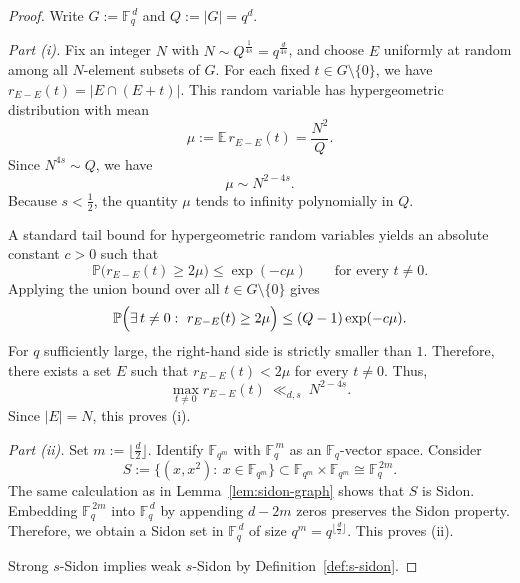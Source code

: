 \documentclass{article}
\begin{document}
\begin{proof}
Write $G:=\mathbb{F}_q^{\,d}$ and $Q:=|G|=q^d$.

\smallskip
\noindent
\emph{Part (i).}
Fix an integer $N$ with $N\sim Q^{\frac{1}{4s}}=q^{\frac{d}{4s}}$, and choose $E$ uniformly at random among all $N$-element subsets of $G$.
For each fixed $t\in G\setminus\{0\}$, we have $r_{E-E}(t)=|E\cap(E+t)|$.
This random variable has hypergeometric distribution with mean
\[
\mu:=\mathbb{E}\,r_{E-E}(t)=\frac{N^2}{Q}.
\]
Since $N^{4s}\sim Q$, we have
\[
\mu\sim N^{2-4s}.
\]
Because $s<\frac{1}{2}$, the quantity $\mu$ tends to infinity polynomially in $Q$.

A standard tail bound for hypergeometric random variables yields an absolute constant $c>0$ such that
\[
\mathbb{P}\bigl(r_{E-E}(t)\ge 2\mu\bigr)\le \exp(-c\mu)
\qquad\text{for every }t\ne 0.
\]
Applying the union bound over all $t\in G\setminus\{0\}$ gives
\[
\mathbb{P}\Bigl(\exists\,t\ne 0:\ r_{E-E}(t)\ge 2\mu\Bigr)
\le
(Q-1)\exp(-c\mu).
\]
For $q$ sufficiently large, the right-hand side is strictly smaller than $1$.
Therefore, there exists a set $E$ such that $r_{E-E}(t)<2\mu$ for every $t\ne 0$.
Thus,
\[
\max_{t\ne 0} r_{E-E}(t)\ \ll_{d,s}\ N^{2-4s}.
\]
Since $|E|=N$, this proves (i).

\smallskip
\noindent
\emph{Part (ii).}
Set $m:=\lfloor \frac{d}{2}\rfloor$.
Identify $\mathbb{F}_{q^m}$ with $\mathbb{F}_q^{\,m}$ as an $\mathbb{F}_q$-vector space.
Consider
\[
S:=\{(x,x^2):\ x\in \mathbb{F}_{q^m}\}\subset \mathbb{F}_{q^m}\times \mathbb{F}_{q^m}\cong \mathbb{F}_q^{\,2m}.
\]
The same calculation as in Lemma~\ref{lem:sidon-graph} shows that $S$ is Sidon.
Embedding $\mathbb{F}_q^{\,2m}$ into $\mathbb{F}_q^{\,d}$ by appending $d-2m$ zeros preserves the Sidon property.
Therefore, we obtain a Sidon set in $\mathbb{F}_q^{\,d}$ of size $q^m=q^{\lfloor \frac{d}{2}\rfloor}$.
This proves (ii).

\smallskip
Strong $s$-Sidon implies weak $s$-Sidon by Definition~\ref{def:s-sidon}.
\end{proof}


\end{document}
